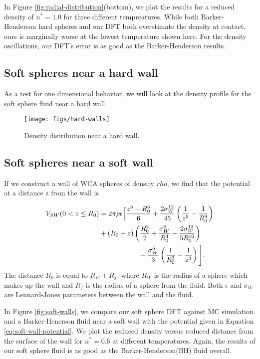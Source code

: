 \documentclass[letterpaper,twocolumn,amsmath,amssymb,prb]{revtex4-1}
\begin{document}
In Figure \ref{fig:radial-distribution}(bottom), we plot the results
for a reduced density of $n^*=1.0$ for three different
tempreatures. While both Barker-Henderson hard spheres and our DFT
both overstimate the density at contact, ours is marginally worse at
the lowest temperature shown here. For the density oscillations, our
DFT's error is as good as the Barker-Henderson results.

\subsection{Soft spheres near a hard wall}

As a test for one dimensional behavior, we will look at the density
profile for the soft sphere fluid near a hard wall.


\begin{figure}
\begin{center}
\texttt{[image: figs/hard-walls]}
\end{center}
\caption{Density distribution near a hard wall.}
\label{fig:hard-walls}
\end{figure}

\subsection{Soft spheres near a soft wall}

If we construct a wall of WCA spheres of density $rho$, we
find that the potential at a distance z from the wall is

\begin{align}
V_{SW}(0 < z \leq R_0) &= 2\pi\rho\epsilon\Big[ \frac{z^3-R_0^3}{6} +
  \frac{2\sigma_W^{12}}{45} \left(\frac{1}{z^9}-\frac{1}{R_0^9}\right)
  \notag \\
  &+ \left( R_0 - z \right)\left(\frac{R_0^2}{2} +
  \frac{\sigma_W^6}{R_0^4} - \frac{2\sigma_W^{12}}{5R_0^{10}}\right)
  \notag \\
  &\hspace{2cm}+\frac{\sigma_W^6}{3}\left(\frac{1}{R_0^3}-\frac{1}{z^3}
  \right) \Bigg].
\label{eq:soft-wall-potential}
\end{align}
The distance $R_0$ is equal to $R_W + R_f$, where $R_W$ is the radius of a
sphere which makes up the wall and $R_f$ is the radius of a sphere
from the fluid. Both $\epsilon$ and $\sigma_W$ are Lennard-Jones
parameters between the wall and the fluid.

In Figure \ref{fig:soft-walls}, we compare our soft sphere DFT
against MC simulation and a Barker-Henerson fluid near a soft wall
with the potential given in Equation \ref{eq:soft-wall-potential}. We
plot the reduced density versus reduced distance from the surface of
the wall for $n^*=0.6$ at different temperatures. Again, the results
of our soft sphere fluid is as good as the Barker-Henderson(BH) fluid
overall.
\end{document}
